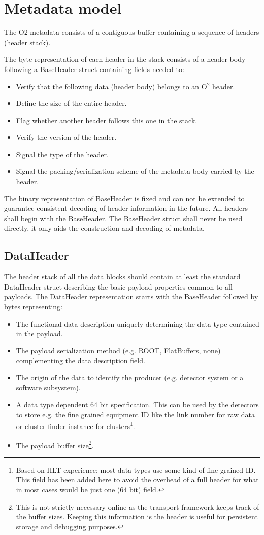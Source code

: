 \documentclass[a4paper,twoside]{article}
\def\O2{O$^2$}
\begin{document}
\section{Metadata model}\label{sec:header}

The O2 metadata consists of a contiguous buffer containing a sequence of headers (header stack).

The byte representation of each header in the stack consists of a header body following a BaseHeader struct containing fields needed to:
\begin{itemize}
  \item Verify that the following data (header body) belongs to an \O2 header.
  \item Define the size of the entire header.
  \item Flag whether another header follows this one in the stack.
  \item Verify the version of the header.
  \item Signal the type of the header.
  \item Signal the packing/serialization scheme of the metadata body carried by the header.
\end{itemize}

The binary representation of BaseHeader is fixed and can not be extended to guarantee consistent decoding of header information in the future. All headers shall begin with the BaseHeader. The BaseHeader struct shall never be used directly, it only aids the construction and decoding of metadata.

\subsection{DataHeader}
The header stack of all the data blocks should contain at least the standard DataHeader struct describing the basic payload properties common to all payloads.
The DataHeader representation starts with the BaseHeader followed by bytes representing:
\begin{itemize}
  \item The functional data description uniquely determining the data type contained in the payload.
  \item The payload serialization method (e.g. ROOT, FlatBuffers, none) complementing the data description field.
  \item The origin of the data to identify the producer (e.g. detector system or a software subsystem).
  \item A data type dependent 64 bit specification. This can be used by the detectors to store e.g. the fine grained equipment ID like the link number for raw data or cluster finder instance for clusters\footnote{Based on HLT experience: most data types use some kind of fine grained ID. This field has been added here to avoid the overhead of a full header for what in most cases would be just one (64 bit) field.}.
  \item The payload buffer size\footnote{This is not strictly necessary online as the transport framework keeps track of the buffer sizes. Keeping this information is the header is useful for persistent storage and debugging purposes.}.
\end{itemize}
\end{document}
